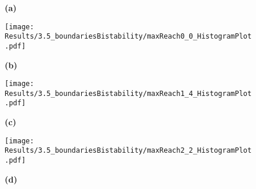            \begin{figure}[htpb!]
                \centering
                \begin{minipage}{0.77\textwidth}
                    \begin{minipage}{0.1\textwidth}
                        \caption*{\small \textbf{(a)}}
                    \end{minipage}
                    \begin{minipage}{0.65\textwidth}
                        \texttt{[image: Results/3.5\_boundariesBistability/maxReach0\_0\_HistogramPlot.pdf]}
                    \end{minipage}
                \end{minipage}
                \begin{minipage}{0.77\textwidth}
                    \begin{minipage}{0.1\textwidth}
                        \caption*{\small \textbf{(b)}}
                    \end{minipage}
                    \begin{minipage}{0.65\textwidth}
                        \texttt{[image: Results/3.5\_boundariesBistability/maxReach1\_4\_HistogramPlot.pdf]}
                    \end{minipage}
                \end{minipage}
                \begin{minipage}{0.77\textwidth}
                    \begin{minipage}{0.1\textwidth}
                        \caption*{\small \textbf{(c)}}
                    \end{minipage}
                    \begin{minipage}{0.65\textwidth}
                        \texttt{[image: Results/3.5\_boundariesBistability/maxReach2\_2\_HistogramPlot.pdf]}
                    \end{minipage}
                \end{minipage}
                \begin{minipage}{0.77\textwidth}
                    \begin{minipage}{0.1\textwidth}
                        \caption*{\small \textbf{(d)}}
                    \end{minipage}
                    \begin{minipage}{0.65\textwidth}

\end{minipage}
\end{minipage}
\end{figure}
